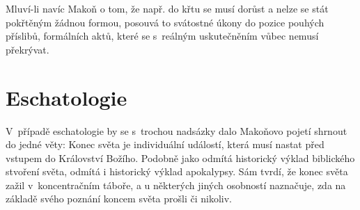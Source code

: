 Mluví-li navíc Makoň o tom, že např. do křtu se musí dorůst a nelze se stát
pokřtěným žádnou formou, posouvá to svátostné úkony do pozice pouhých příslibů,
formálních aktů, které se s~reálným uskutečněním vůbec nemusí překrývat.

\section{Eschatologie}

V~případě eschatologie by se s~trochou nadsázky dalo Makoňovo pojetí shrnout do
jedné věty: Konec světa je individuální událostí, která musí nastat před vstupem
do Království Božího. Podobně jako odmítá historický výklad biblického stvoření
světa, odmítá i historický výklad apokalypsy. Sám tvrdí, že konec světa zažil
v~koncentračním táboře, a u některých jiných osobností naznačuje, zda na základě
svého poznání koncem světa prošli či nikoliv.

